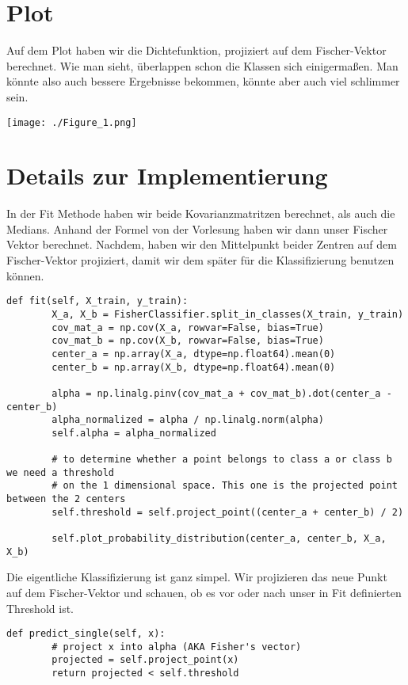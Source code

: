 \section*{Plot}

Auf dem Plot haben wir die Dichtefunktion, projiziert auf dem Fischer-Vektor berechnet. Wie man sieht, überlappen
schon die Klassen sich einigermaßen. Man könnte also auch bessere Ergebnisse bekommen, könnte aber auch viel
schlimmer sein.


\texttt{[image: ./Figure\_1.png]}

\section*{Details zur Implementierung}

In der Fit Methode haben wir beide Kovarianzmatritzen berechnet, als auch die Medians. Anhand der Formel von der
Vorlesung haben wir dann unser Fischer Vektor berechnet. Nachdem, haben wir den Mittelpunkt beider Zentren auf dem
Fischer-Vektor projiziert, damit wir dem später für die Klassifizierung benutzen können.

\begin{lstlisting}[style=py]
    def fit(self, X_train, y_train):
        X_a, X_b = FisherClassifier.split_in_classes(X_train, y_train)
        cov_mat_a = np.cov(X_a, rowvar=False, bias=True)
        cov_mat_b = np.cov(X_b, rowvar=False, bias=True)
        center_a = np.array(X_a, dtype=np.float64).mean(0)
        center_b = np.array(X_b, dtype=np.float64).mean(0)

        alpha = np.linalg.pinv(cov_mat_a + cov_mat_b).dot(center_a - center_b)
        alpha_normalized = alpha / np.linalg.norm(alpha)
        self.alpha = alpha_normalized

        # to determine whether a point belongs to class a or class b we need a threshold
        # on the 1 dimensional space. This one is the projected point between the 2 centers
        self.threshold = self.project_point((center_a + center_b) / 2)

        self.plot_probability_distribution(center_a, center_b, X_a, X_b)

\end{lstlisting}

Die eigentliche Klassifizierung ist ganz simpel. Wir projizieren das neue Punkt auf dem Fischer-Vektor und schauen,
ob es vor oder nach unser in Fit definierten Threshold ist.

\begin{lstlisting}[style=py]
    def predict_single(self, x):
        # project x into alpha (AKA Fisher's vector)
        projected = self.project_point(x)
        return projected < self.threshold
\end{lstlisting}

